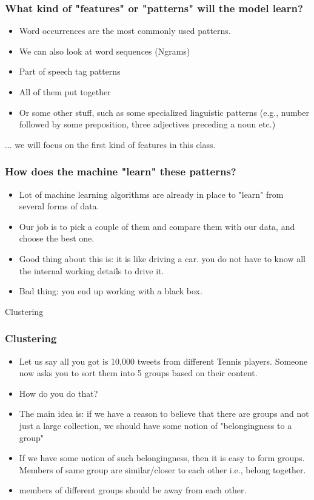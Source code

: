 \documentclass{beamer}
\begin{document}
\begin{frame}
\frametitle{What kind of "features" or "patterns" will the model learn?}
\begin{itemize}
\item Word occurrences are the most commonly used patterns.
\item We can also look at word sequences (Ngrams)
\item Part of speech tag patterns
\item All of them put together
\item Or some other stuff, such as some specialized linguistic patterns (e.g., number followed by some preposition, three adjectives preceding a noun etc.)
\end{itemize}
... we will focus on the first kind of features in this class. 
\end{frame}

\begin{frame}
\frametitle{How does the machine "learn" these patterns?}
\begin{itemize}
\item Lot of machine learning algorithms are already in place to "learn" from several forms of data.
\item Our job is to pick a couple of them and compare them with our data, and choose the best one. \pause
\item Good thing about this is: it is like driving a car. you do not have to know all the internal working details to drive it.
\item Bad thing: you end up working with a black box.
\end{itemize}
\end{frame}

\begin{frame}
\Large Clustering
\end{frame}

\begin{frame}
\frametitle{Clustering}
\begin{itemize}
\item Let us say all you got is 10,000 tweets from different Tennis players. Someone now asks you to sort them into 5 groups based on their content. 
\item How do you do that? \pause
\item The main idea is: if we have a reason to believe that there are groups and not just a large collection, we should have some notion of "belongingness to a group" \pause
\item If we have some notion of such belongingness, then it is easy to form groups. Members of same group are similar/closer to each other i.e., belong together.
\item members of different groups should be away from each other. 
\end{itemize}
\end{frame}
\end{document}
